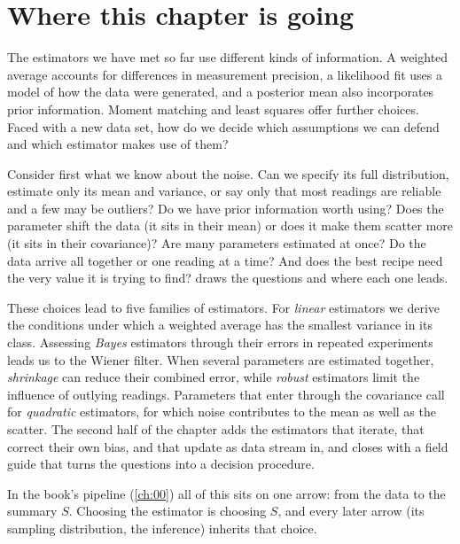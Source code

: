 \section*{Where this chapter is going}
\label{T5a:sec:roadmap}

The estimators we have met so far use different kinds of information. A
weighted average accounts for differences in measurement precision, a
likelihood fit uses a model of how the data were generated, and a posterior
mean also incorporates prior information. Moment matching and least squares
offer further choices. Faced with a new data set, how do we decide which
assumptions we can defend and which estimator makes use of them?

Consider first what we know about the noise. Can we specify its full
distribution, estimate only its mean and variance, or say only that most
readings are reliable and a few may be outliers? Do we have prior
information worth using? Does the parameter shift the data (it sits in their
mean) or does it make them scatter more (it sits in their covariance)? Are
many parameters estimated at once? Do the data arrive all together or one
reading at a time? And does the best recipe need the very value it is
trying to find?  draws the questions and where each
one leads.

These choices lead to five families of estimators. For \emph{linear}
estimators we derive the conditions under which a weighted average has the
smallest variance in its class. Assessing \emph{Bayes} estimators through their
errors in repeated experiments leads us to the Wiener filter. When several
parameters are estimated together, \emph{shrinkage} can reduce their combined
error, while \emph{robust} estimators limit the influence of outlying readings.
Parameters that enter through the covariance call for \emph{quadratic}
estimators, for which noise contributes to the mean as well as the scatter. The second half of the chapter adds
the estimators that iterate, that correct their own bias, and that update
as data stream in, and closes with a field guide that turns the questions
into a decision procedure.

In the book's pipeline (\cref{ch:00}) all of this sits on one arrow: from
the data to the summary $S$. Choosing the estimator is choosing $S$, and
every later arrow (its sampling distribution, the inference) inherits that
choice.

